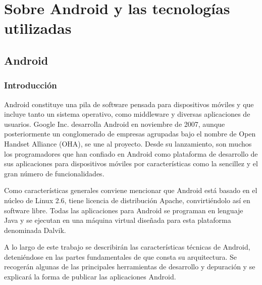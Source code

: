 \documentclass[12 pt, a4paper, twoside]{article}
\begin{document}


\newpage

\tableofcontents

\newpage

\section{Sobre Android y las tecnologías utilizadas}
\subsection{Android}
\subsubsection{Introducción}
Android constituye una pila de software pensada para dispositivos móviles y
que incluye tanto un sistema operativo, como middleware y diversas aplicaciones
de usuarios. Google Inc. desarrolla Android en noviembre de 2007, aunque
posteriormente un conglomerado de empresas agrupadas bajo el nombre de Open
Handset Alliance (OHA), se une al proyecto. Desde su lanzamiento, son muchos
los programadores que han confiado en Android como plataforma de desarrollo de
sus aplicaciones para dispositivos móviles por características como la sencillez y
el gran número de funcionalidades.

Como características generales conviene mencionar que Android está basado en
el núcleo de Linux 2.6, tiene licencia de distribución Apache, convirtiéndolo así en
software libre. Todas las aplicaciones para Android se programan en lenguaje Java
y se ejecutan en una máquina virtual diseñada para esta plataforma denominada
Dalvik.

A lo largo de este trabajo se describirán las características técnicas de Android,
deteniéndose en las partes fundamentales de que consta su arquitectura. Se recogerán
algunas de las principales herramientas de desarrollo y depuración y se
explicará la forma de publicar las aplicaciones Android. %
\end{document}
